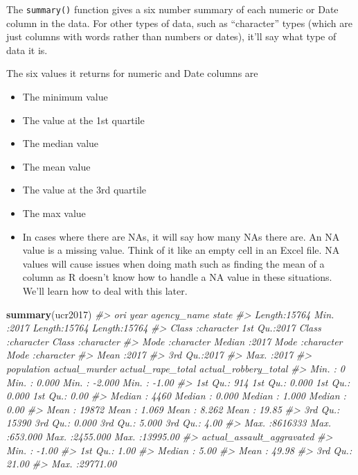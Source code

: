 \documentclass[
  12pt,
]{book}
\newenvironment{Shaded}{\begin{snugshade}}{\end{snugshade}}
\newcommand{\CommentTok}[1]{\textcolor[rgb]{0.37,0.37,0.37}{\textit{#1}}}
\newcommand{\KeywordTok}[1]{\textcolor[rgb]{0.27,0.27,0.27}{\textbf{#1}}}
\newcommand{\NormalTok}[1]{#1}
\providecommand{\tightlist}{%
  \setlength{\itemsep}{0pt}\setlength{\parskip}{0pt}}
\begin{document}
The \texttt{summary()} function gives a six number summary of each numeric or Date column in the data. For other types of data, such as ``character'' types (which are just columns with words rather than numbers or dates), it'll say what type of data it is.

The six values it returns for numeric and Date columns are

\begin{itemize}
\tightlist
\item
  The minimum value
\item
  The value at the 1st quartile
\item
  The median value
\item
  The mean value
\item
  The value at the 3rd quartile
\item
  The max value
\item
  In cases where there are NAs, it will say how many NAs there are. An NA value is a missing value. Think of it like an empty cell in an Excel file. NA values will cause issues when doing math such as finding the mean of a column as R doesn't know how to handle a NA value in these situations. We'll learn how to deal with this later.
\end{itemize}

\begin{Shaded}
\begin{Highlighting}[]
\KeywordTok{summary}\NormalTok{(ucr2017)}
\CommentTok{\#>      ori                 year      agency\_name           state          }
\CommentTok{\#>  Length:15764       Min.   :2017   Length:15764       Length:15764      }
\CommentTok{\#>  Class :character   1st Qu.:2017   Class :character   Class :character  }
\CommentTok{\#>  Mode  :character   Median :2017   Mode  :character   Mode  :character  }
\CommentTok{\#>                     Mean   :2017                                        }
\CommentTok{\#>                     3rd Qu.:2017                                        }
\CommentTok{\#>                     Max.   :2017                                        }
\CommentTok{\#>    population      actual\_murder     actual\_rape\_total  actual\_robbery\_total}
\CommentTok{\#>  Min.   :      0   Min.   :  0.000   Min.   :  {-}2.000   Min.   :   {-}1.00    }
\CommentTok{\#>  1st Qu.:    914   1st Qu.:  0.000   1st Qu.:   0.000   1st Qu.:    0.00    }
\CommentTok{\#>  Median :   4460   Median :  0.000   Median :   1.000   Median :    0.00    }
\CommentTok{\#>  Mean   :  19872   Mean   :  1.069   Mean   :   8.262   Mean   :   19.85    }
\CommentTok{\#>  3rd Qu.:  15390   3rd Qu.:  0.000   3rd Qu.:   5.000   3rd Qu.:    4.00    }
\CommentTok{\#>  Max.   :8616333   Max.   :653.000   Max.   :2455.000   Max.   :13995.00    }
\CommentTok{\#>  actual\_assault\_aggravated}
\CommentTok{\#>  Min.   :   {-}1.00         }
\CommentTok{\#>  1st Qu.:    1.00         }
\CommentTok{\#>  Median :    5.00         }
\CommentTok{\#>  Mean   :   49.98         }
\CommentTok{\#>  3rd Qu.:   21.00         }
\CommentTok{\#>  Max.   :29771.00}
\end{Highlighting}
\end{Shaded}
\end{document}
